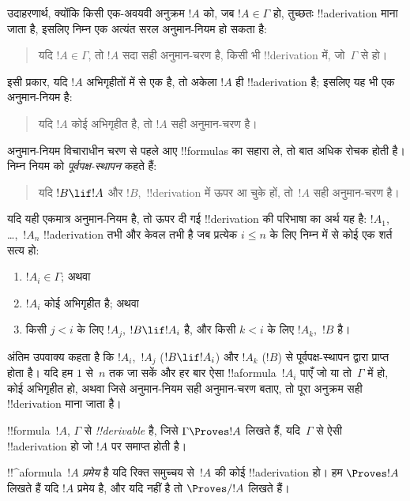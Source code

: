 \documentclass[../../../include/open-logic-section]{subfiles}
\begin{document}
उदाहरणार्थ, क्योंकि किसी एक-अवयवी अनुक्रम $!A$ को, जब $!A \in \Gamma$ हो,
तुच्छतः !!a{derivation} माना जाता है, इसलिए निम्न एक अत्यंत सरल अनुमान-नियम
हो सकता है:
\begin{quote}
  यदि $!A \in \Gamma$, तो $!A$ सदा सही अनुमान-चरण है, किसी भी
  !!{derivation} में, जो~$\Gamma$ से हो।
\end{quote}
इसी प्रकार, यदि $!A$ अभिगृहीतों में से एक है, तो अकेला $!A$ ही
!!a{derivation} है; इसलिए यह भी एक अनुमान-नियम है:
\begin{quote}
  यदि $!A$ कोई अभिगृहीत है, तो $!A$ सही अनुमान-चरण है।
\end{quote}
अनुमान-नियम विचाराधीन चरण से पहले आए !!{formula}s का सहारा ले, तो बात अधिक
रोचक होती है। निम्न नियम को \emph{पूर्वपक्ष-स्थापन} कहते हैं:
\begin{quote}
  यदि $!B \lif !A$ और $!B$,~!!{derivation} में ऊपर आ चुके हों, तो~$!A$
  सही अनुमान-चरण है।
\end{quote}
यदि यही एकमात्र अनुमान-नियम है, तो ऊपर दी गई !!{derivation} की परिभाषा का
अर्थ यह है: $!A_1$, \dots,~$!A_n$ !!a{derivation} तभी और केवल तभी है जब
प्रत्येक $i \le n$ के लिए निम्न में से कोई एक शर्त सत्य हो:
\begin{enumerate}
\item $!A_i \in \Gamma$; अथवा
\item $!A_i$ कोई अभिगृहीत है; अथवा
\item किसी $j < i$ के लिए $!A_j$, $!B \lif !A_i$ है, और किसी $k < i$ के
  लिए $!A_k$,~$!B$ है।
\end{enumerate}
अंतिम उपवाक्य कहता है कि $!A_i$,~$!A_j$ ($!B \lif !A_i$) और $!A_k$
($!B$) से पूर्वपक्ष-स्थापन द्वारा प्राप्त होता है। यदि हम $1$ से~$n$ तक
जा सकें और हर बार ऐसा !!a{formula}~$!A_i$ पाएँ जो या तो~$\Gamma$ में हो,
कोई अभिगृहीत हो, अथवा जिसे अनुमान-नियम सही अनुमान-चरण बताए, तो पूरा अनुक्रम
सही !!{derivation} माना जाता है।

\begin{defn}[!!^{derivability}]
!!{formula}~$!A$, $\Gamma$ से \emph{!!{derivable}} है, जिसे
$\Gamma \Proves !A$ लिखते हैं, यदि~$\Gamma$ से ऐसी !!a{derivation} हो जो
$!A$ पर समाप्त होती है।
\end{defn}

\begin{defn}[प्रमेय]
!!^a{formula}~$!A$ \emph{प्रमेय} है यदि रिक्त समुच्चय से~$!A$ की कोई
!!a{derivation} हो। हम $\Proves !A$ लिखते हैं यदि $!A$ प्रमेय है, और यदि
नहीं है तो
$\Proves/ !A$ लिखते हैं।
\end{defn}
\end{document}
